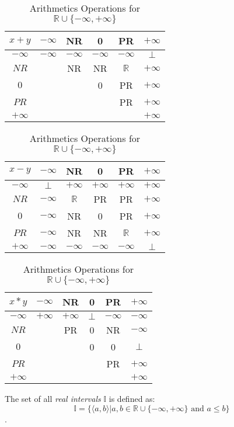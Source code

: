 \begin{table} \label{tab:arithOp}
\begin{tabular}{c||*{5}{c|}}
$x + y$
&$-\infty$&NR&0
&PR&$+\infty$\\\hline
$-\infty$ &$-\infty$&$-\infty$&$-\infty$&$-\infty$&$\bot$\\\hline
$NR$ &&NR&NR&$\mathbb{R}$&$+\infty$\\\hline
$0$&&&0&PR&$+\infty$\\\hline
$PR$ &&&&PR&$+\infty$\\\hline
$+\infty$ &&&&&$+\infty$\\\hline
\end{tabular}
\quad
\begin{tabular}{c||*{5}{c|}}
$x - y$
&$-\infty$&NR&0
&PR&$+\infty$\\\hline
$-\infty$ &$\bot$&$+\infty$&$+\infty$&$+\infty$&$+\infty$\\\hline
$NR$ &$-\infty$&$\mathbb{R}$&PR&PR&$+\infty$\\\hline
$0$&$-\infty$&NR&0&PR&$+\infty$\\\hline
$PR$ &$-\infty$&NR&NR&$\mathbb{R}$&$+\infty$\\\hline
$+\infty$ &$-\infty$&$-\infty$&$-\infty$&$-\infty$&$\bot$\\\hline
\end{tabular}
\newline
\vspace*{1 cm}
\newline
\begin{center}
\begin{tabular}{c||*{5}{c|}}
$x * y$
&$-\infty$&NR&0
&PR&$+\infty$\\\hline
$-\infty$ &$+\infty$&$+\infty$&$\bot$&$-\infty$&$-\infty$\\\hline
$NR$ &&PR&0&NR&$-\infty$\\\hline
$0$&&&0&0&$\bot$\\\hline
$PR$ &&&&PR&$+\infty$\\\hline
$+\infty$ &&&&&$+\infty$\\\hline
\end{tabular}
\end{center}
\caption{Arithmetics Operations for $\mathbb{R} \cup \{-\infty, +\infty\}$}
\end{table}

\begin{definition} \label{def:real_intervals}
The set of all \emph{real intervals} $\mathbb{I}$ is defined as: \[\mathbb{I} = \{\langle a, b \rangle | a, b \in \mathbb{R} \cup \{-\infty, +\infty\} \text{ and } a \le b \}\].
\end{definition}

